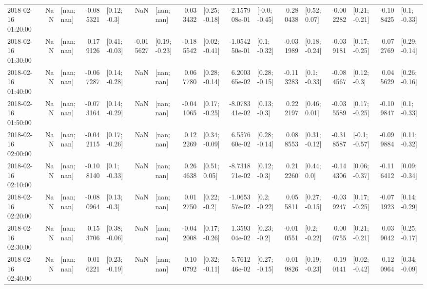 \begin{tabular}{lrlrlrlrlrlrlrlrl}
2018-02-16 01:20:00 &       NaN &      [nan; nan] & -0.085321 &    [0.12; -0.3] &       NaN &      [nan; nan] &  0.033432 &   [0.25; -0.18] & -2.157908e-01 &   [-0.0; -0.45] &  0.280438 &    [0.52; 0.07] & -0.002282 &   [0.21; -0.21] & -0.108425 &    [0.1; -0.33] \\
2018-02-16 01:30:00 &       NaN &      [nan; nan] &  0.179126 &   [0.41; -0.03] & -0.015627 &   [0.19; -0.23] & -0.185542 &   [0.02; -0.41] & -1.054250e-01 &    [0.1; -0.32] & -0.031989 &   [0.18; -0.24] & -0.039181 &   [0.17; -0.25] &  0.072769 &   [0.29; -0.14] \\
2018-02-16 01:40:00 &       NaN &      [nan; nan] & -0.067287 &   [0.14; -0.28] &       NaN &      [nan; nan] &  0.067780 &   [0.28; -0.14] &  6.200365e-02 &   [0.28; -0.15] & -0.113283 &    [0.1; -0.33] & -0.084567 &    [0.12; -0.3] &  0.045629 &   [0.26; -0.16] \\
2018-02-16 01:50:00 &       NaN &      [nan; nan] & -0.073164 &   [0.14; -0.29] &       NaN &      [nan; nan] & -0.041065 &   [0.17; -0.25] & -8.078341e-02 &    [0.13; -0.3] &  0.222197 &    [0.46; 0.01] & -0.035589 &   [0.17; -0.25] & -0.109847 &    [0.1; -0.33] \\
2018-02-16 02:00:00 &       NaN &      [nan; nan] & -0.042115 &   [0.17; -0.26] &       NaN &      [nan; nan] &  0.122269 &   [0.34; -0.09] &  6.557660e-02 &   [0.28; -0.14] &  0.088553 &   [0.31; -0.12] & -0.318587 &   [-0.1; -0.57] & -0.099884 &   [0.11; -0.32] \\
2018-02-16 02:10:00 &       NaN &      [nan; nan] & -0.108140 &    [0.1; -0.33] &       NaN &      [nan; nan] &  0.264638 &    [0.51; 0.05] & -8.731871e-02 &    [0.12; -0.3] &  0.212260 &     [0.44; 0.0] & -0.144306 &   [0.06; -0.37] & -0.116412 &   [0.09; -0.34] \\
2018-02-16 02:20:00 &       NaN &      [nan; nan] & -0.080964 &    [0.13; -0.3] &       NaN &      [nan; nan] &  0.012750 &    [0.22; -0.2] & -1.065357e-02 &    [0.2; -0.22] &  0.055811 &   [0.27; -0.15] & -0.039247 &   [0.17; -0.25] & -0.071923 &   [0.14; -0.29] \\
2018-02-16 02:30:00 &       NaN &      [nan; nan] &  0.153706 &   [0.38; -0.06] &       NaN &      [nan; nan] & -0.042008 &   [0.17; -0.26] &  1.359304e-02 &    [0.23; -0.2] & -0.010551 &    [0.2; -0.22] &  0.000755 &   [0.21; -0.21] &  0.039042 &   [0.25; -0.17] \\
2018-02-16 02:40:00 &       NaN &      [nan; nan] &  0.016221 &   [0.23; -0.19] &       NaN &      [nan; nan] &  0.100792 &   [0.32; -0.11] &  5.761246e-02 &   [0.27; -0.15] & -0.019826 &   [0.19; -0.23] & -0.190141 &   [0.02; -0.42] &  0.120964 &   [0.34; -0.09] \\

\end{tabular}
